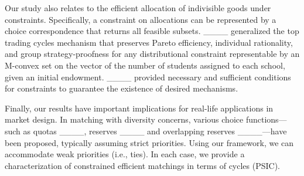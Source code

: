 Our study also relates to the efficient allocation of indivisible goods under constraints. Specifically, a constraint on allocations can be represented by a choice correspondence that returns all feasible subsets.
____ generalized the top trading cycles mechanism that preserves Pareto efficiency, individual rationality, and group strategy-proofness for any distributional constraint representable by an M-convex set on the vector of the number of students assigned to each school, given an initial endowment.
____ provided necessary and sufficient conditions for constraints to guarantee the existence of desired mechanisms.

Finally, our results have important implications for real-life applications in market design. In matching with diversity concerns, various choice functions---such as quotas ____, reserves ____ and overlapping reserves ____---have been proposed, typically assuming strict priorities. Using our framework, we can accommodate weak priorities (i.e., ties). In each case, we provide a characterization of constrained efficient matchings in terms of cycles (PSIC).